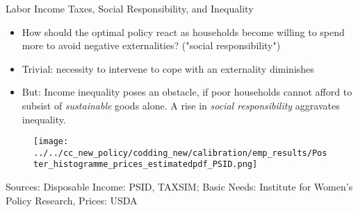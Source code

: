 \begin{frame}{Labor Income Taxes, Social Responsibility, and Inequality}
	\begin{itemize}
		\item How should the optimal policy react as households become willing to spend more to avoid negative externalities? ("social responsibility")
		\vspace{2mm}
		\item Trivial: necessity to intervene to cope with an externality diminishes
		\vspace{2mm}
		\item But: Income inequality poses an obstacle, if poor households cannot afford to subsist of \textit{sustainable} goods alone. A rise in \textit{social responsibility} aggravates inequality. 
	\end{itemize}
\end{frame}

\begin{frame}{}
\vspace{4mm}
\begin{minipage}[]{1\textwidth}
	\begin{figure}
		\texttt{[image: ../../cc\_new\_policy/codding\_new/calibration/emp\_results/Poster\_histogramme\_prices\_estimatedpdf\_PSID.png]}	
	\end{figure}
	\centering
	\tiny{Sources: Disposable Income: PSID, TAXSIM; Basic Needs: Institute for Women's Policy Research, Prices: USDA}
\end{minipage}\end{frame}



